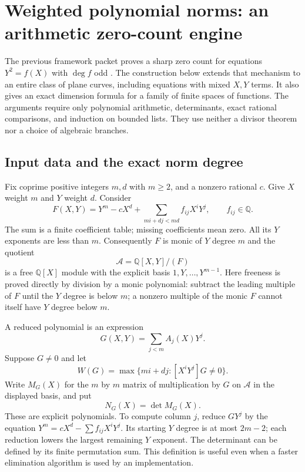 \section{Weighted polynomial norms: an arithmetic zero-count engine}
\label{sec:weighted-norm}

The previous framework packet proves a sharp zero count for equations
$Y^2=f(X)$ with $\deg f$ odd \cite{repoEmbedding}. The construction below extends that
mechanism to an entire class of plane curves, including equations with
mixed $X,Y$ terms.  It also gives an exact dimension formula for a family
of finite spaces of functions.  The arguments require only polynomial
arithmetic, determinants, exact rational comparisons, and induction on
bounded lists.  They use neither a divisor theorem nor a choice of
algebraic branches.

\subsection{Input data and the exact norm degree}

Fix coprime positive integers $m,d$ with $m\geq2$, and a nonzero rational
$c$.  Give $X$ weight $m$ and $Y$ weight $d$.  Consider
\begin{equation}\label{eq:weighted-curve}
 F(X,Y)=Y^m-cX^d+
       \sum_{mi+dj<md} f_{ij}X^iY^j,
 \qquad f_{ij}\in\mathbb Q.
\end{equation}
The sum is a finite coefficient table; missing coefficients mean zero.
All its $Y$ exponents are less than $m$.  Consequently $F$ is monic of
$Y$ degree $m$ and the quotient
\[
 \mathcal A=\mathbb Q[X,Y]/(F)
\]
is a free $\mathbb Q[X]$ module with the explicit basis
$1,Y,\ldots,Y^{m-1}$.  Here freeness is proved directly by division by a
monic polynomial: subtract the leading multiple of $F$ until the $Y$
degree is below $m$; a nonzero multiple of the monic $F$ cannot itself
have $Y$ degree below $m$.

A reduced polynomial is an expression
\[
 G(X,Y)=\sum_{j<m} A_j(X)Y^j.
\]
Suppose $G\ne0$ and let
\begin{equation}\label{eq:weighted-size}
 W(G)=\max\{mi+dj:[X^iY^j]G\ne0\}.
\end{equation}
Write $M_G(X)$ for the $m$ by $m$ matrix of multiplication by $G$ on
$\mathcal A$ in the displayed basis, and put
\[
 N_G(X)=\det M_G(X).
\]
These are explicit polynomials.  To compute column $j$, reduce $GY^j$
by the equation $Y^m=cX^d-\sum f_{ij}X^iY^j$.  Its starting $Y$ degree
is at most $2m-2$; each reduction lowers the largest remaining $Y$
exponent.  The determinant can be defined by its finite permutation sum.
This definition is useful even when a faster elimination algorithm is
used by an implementation.

